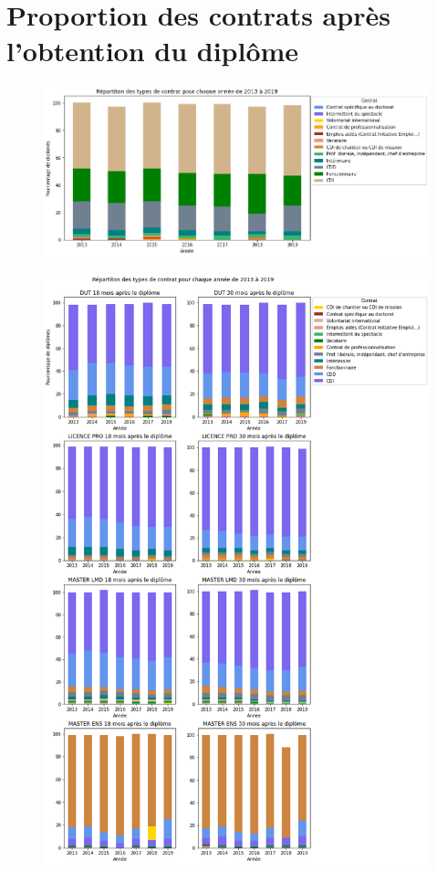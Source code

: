 \documentclass[12pt, a4paper, titlepage, table]{article}
\begin{document}
\section{Proportion des contrats après l'obtention du diplôme}

\begin{figure}[H]
	\centering
	\includegraphics[width=1\textwidth]{../graphs/repartition_contrats_global.png}
\end{figure}

\begin{figure}[H]
	\centering
	\includegraphics[width=1\textwidth]{../graphs/repartition_contrats_situation.png}
\end{figure}
\end{document}
